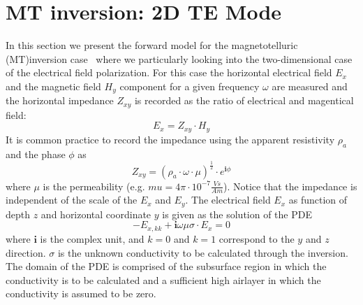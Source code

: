%
%
%


\section{MT inversion: 2D TE Mode}\label{sec:forward 2DMT TEMode}
In this section we present the forward model for the magnetotelluric (MT)inversion case~\cite{ChaveJones2012a} 
where we particularly looking into the two-dimensional case of the electrical field polarization.
For this case the horizontal electrical field $E_x$ and the magnetic field $H_y$ component 
for a given frequency $\omega$ are measured and the horizontal impedance $Z_{xy}$  is recorded as the ratio of
electrical and magentical field: 
\begin{equation}\label{ref:2DMTTE:EQU:1}
E_x  = Z_{xy} \cdot H_y 
\end{equation}
It is common practice to record the impedance using the apparent resistivity $\rho_a$ and the 
phase $\phi$ as 
\begin{equation}\label{ref:2DMTTE:EQU:2}
Z_{xy} = (\rho_a \cdot \omega \cdot \mu) ^{\frac{1}{2}} \cdot e^{\mathbf{i} \phi}
\end{equation}
where $\mu$ is the permeability (e.g. $mu = 4 \pi \cdot 10^{-7} \frac{Vs}{Am}$). Notice that the impedance is independent of the scale of the $E_x$ and $E_y$.
The electrical field $E_x$ as function of depth $z$ and horizontal coordinate $y$ is given as the solution of the 
PDE
\begin{equation}\label{ref:2DMTTE:EQU:3}
- E_{x,kk}  + \mathbf{i} \omega \mu \sigma \cdot E_x = 0 
\end{equation}
where $\mathbf{i}$ is the complex unit, and $k=0$ and $k=1$ correspond to the $y$ and $z$ direction.
$\sigma$ is the unknown conductivity to be calculated through the inversion. The domain 
of the PDE is comprised of the subsurface region in which the conductivity is to be calculated 
and a sufficient high airlayer in which the conductivity is assumed to be zero.


